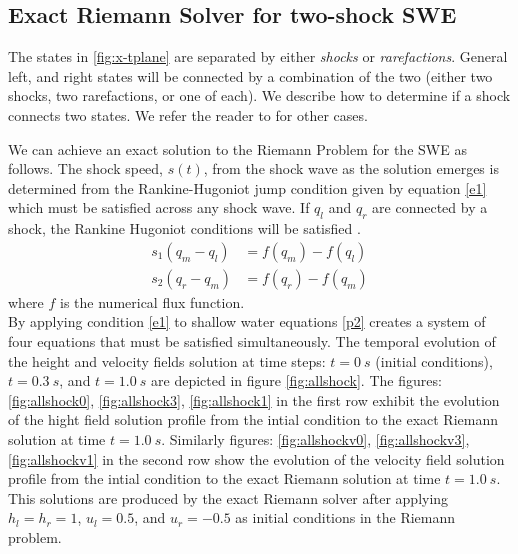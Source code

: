 \documentclass[10pt,a4paper]{article}
\begin{document}
	

	\subsection{Exact Riemann Solver for two-shock SWE}
The states in \ref{fig:x-tplane} are separated by either {\em shocks} or {\em rarefactions}. General left, and right states will be connected by a combination of the two (either two shocks, two rarefactions, or one of each).  We describe how to determine if a shock connects two states.  We refer the reader to \citet{leveque2002finite} for other cases. 

We can achieve an exact solution to the Riemann Problem for the SWE as follows. 
The shock speed, $s(t)$,  from the shock wave as the solution emerges is determined from the Rankine-Hugoniot jump condition given by equation \eqref{e1}  which must be satisfied across any shock wave.  If $q_l$ and $q_r$ are connected by a shock, the Rankine Hugoniot conditions will be satisfied \cite{ma-ah-be-ca-ge-ha-ke-le-le:2016}. 
	\begin{equation}
		\begin{aligned}
			s_1(q_{m} - q_{l}) & = f(q_{m}) - f(q_{l}) \\
			s_2(q_{r} - q_{m}) & = f(q_{r}) - f(q_{m})
		\end{aligned}
		\label{e1}
	\end{equation}
where $f$ is the numerical flux function. \\

By applying condition  \eqref{e1} to shallow water equations \eqref{p2}  creates a system of four equations that must be satisfied simultaneously. The temporal evolution of the height and velocity fields solution at time steps: $t=0~s$ (initial conditions), $t = 0.3~s$, and $t = 1.0~s$ are  depicted in figure \ref{fig:allshock}. The figures: \ref{fig:allshock0}, \ref{fig:allshock3}, \ref{fig:allshock1} in the first row exhibit the evolution of the hight field solution profile from the intial condition to the exact Riemann solution at time $t = 1.0~s$. Similarly figures: \ref{fig:allshockv0}, \ref{fig:allshockv3}, \ref{fig:allshockv1} in the second row show the evolution of the velocity field solution profile from the intial condition to the exact Riemann solution at time $t = 1.0~s$. This solutions are produced by the exact Riemann solver after applying $h_l = h_r = 1$, $u_l  =  0.5$, and $u_r = -0.5$ as initial conditions in  the Riemann problem.
	
\end{document}
